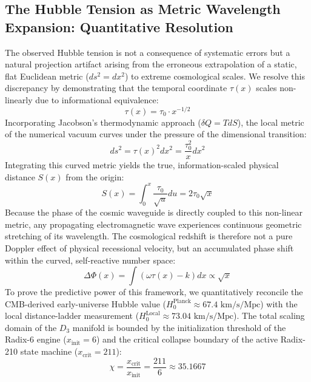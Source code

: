 \documentclass[11pt,a4paper]{article}
\theoremstyle{plain}
\theoremstyle{definition}
\theoremstyle{remark}
\begin{document}
\subsection{The Hubble Tension as Metric Wavelength Expansion: Quantitative Resolution} 
The observed Hubble tension is not a consequence of systematic errors but a natural projection artifact arising from the erroneous extrapolation of a static, flat Euclidean metric ($ds^2 = dx^2$) to extreme cosmological scales. We resolve this discrepancy by demonstrating that the temporal coordinate $\tau(x)$ scales non-linearly due to informational equivalence: 
\begin{equation} 
\tau(x) = \tau_0 \cdot x^{-1/2} 
\end{equation} 
Incorporating Jacobson's thermodynamic approach ($\delta Q = T dS$), the local metric of the numerical vacuum curves under the pressure of the dimensional transition: 
\begin{equation} 
ds^2 = \tau(x)^2 dx^2 = \frac{\tau_0^2}{x} dx^2 
\end{equation} 
Integrating this curved metric yields the true, information-scaled physical distance $S(x)$ from the origin: 
\begin{equation} 
S(x) = \int_0^x \frac{\tau_0}{\sqrt{u}} du = 2 \tau_0 \sqrt{x} 
\end{equation} 
Because the phase of the cosmic waveguide is directly coupled to this non-linear metric, any propagating electromagnetic wave experiences continuous geometric stretching of its wavelength. The cosmological redshift is therefore not a pure Doppler effect of physical recessional velocity, but an accumulated phase shift within the curved, self-reactive number space: 
\begin{equation} 
\Delta\Phi(x) = \int (\omega \tau(x) - k) dx \propto \sqrt{x} 
\end{equation} 
To prove the predictive power of this framework, we quantitatively reconcile the CMB-derived early-universe Hubble value ($H_0^{\text{Planck}} \approx 67.4 \text{ km/s/Mpc}$) with the local distance-ladder measurement ($H_0^{\text{Local}} \approx 73.04 \text{ km/s/Mpc}$). The total scaling domain of the $D_3$ manifold is bounded by the initialization threshold of the Radix-6 engine ($x_{\text{init}} = 6$) and the critical collapse boundary of the active Radix-210 state machine ($x_{\text{crit}} = 211$):
\begin{equation}
\chi = \frac{x_{\text{crit}}}{x_{\text{init}}} = \frac{211}{6} \approx 35.1667
\end{equation}
\end{document}
